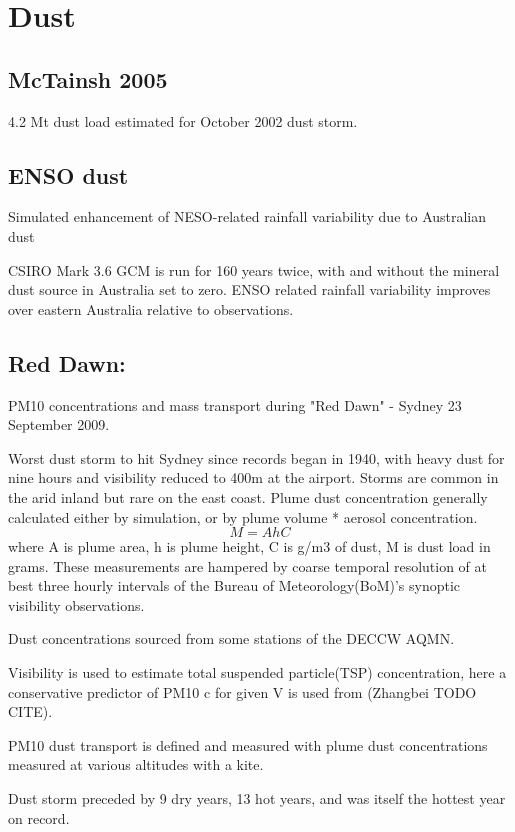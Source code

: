 \section{Dust}

\subsection{McTainsh 2005}
4.2 Mt dust load estimated for October 2002 dust storm.

\subsection{ENSO dust \cite{Rotstayn_2011}}
Simulated enhancement of NESO-related rainfall variability due to Australian dust

CSIRO Mark 3.6 GCM is run for 160 years twice, with and without the mineral dust source in Australia set to zero.
ENSO related rainfall variability improves over eastern Australia relative to observations.


\subsection{Red Dawn: \cite{Leys_2011}}
PM10 concentrations and mass transport during "Red Dawn" - Sydney 23 September 2009.

Worst dust storm to hit Sydney since records began in 1940, with heavy dust for nine hours and visibility reduced to 400m at the airport.
Storms are common in the arid inland but rare on the east coast.
Plume dust concentration generally calculated either by simulation, or by plume volume * aerosol concentration.
$$M = AhC$$ 
where A is plume area, h is plume height, C is g/m3 of dust, M is dust load in grams.
These measurements are hampered by coarse temporal resolution of at best three hourly intervals of the Bureau of Meteorology(BoM)'s synoptic visibility observations.

Dust concentrations sourced from some stations of the DECCW AQMN.

Visibility is used to estimate total suspended particle(TSP) concentration, here a conservative predictor of PM10 c for given V is used from (Zhangbei TODO CITE).

PM10 dust transport is defined and measured with plume dust concentrations measured at various altitudes with a kite. 

Dust storm preceded by 9 dry years, 13 hot years, and was itself the hottest year on record.

